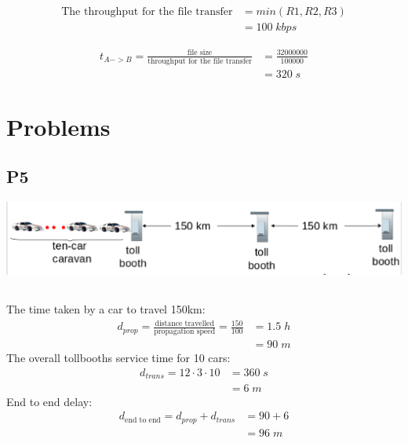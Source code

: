 \documentclass[journal]{IEEEtran}
\begin{document}
\subsection{}
\begin{equation*} 
  \begin{split}
    \text{The throughput for the file transfer} & = min(R1, R2, R3) \\
   & = 100\;kbps
  \end{split}
\end{equation*}

\begin{equation*}
  \begin{split}
  t_{A->B}=\frac{\text{file size}}{\text{throughput for the file transfer}} & = \frac{32000000}{100000} \\
  & = 320\;s
  \end{split}
\end{equation*}

\section{Problems}


\subsection*{P5}
\includegraphics[scale=0.25]{P5}
\subsection{}
The time taken by a car to travel 150\;km:
\begin{equation*}
  \begin{split}
d_{prop}=\frac{\text{distance travelled}}{\text{propagation speed}}  = \frac{150}{100} & = 1.5\;h\\
& = 90\;m
  \end{split}
\end{equation*}
\hspace{0.3cm}The overall tollbooths service time for 10 cars:
\begin{equation*}
  \begin{split}
  d_{trans} = 12 \cdot 3 \cdot 10 & = 360\;s \\
  & = 6\;m
  \end{split}
\end{equation*}
\hspace{0.3cm}End to end delay:
\begin{equation*}
  \begin{split}
  d_{\text{end to end}} = d_{prop} + d_{trans} & = 90 + 6 \\
  & = 96 \;m
  \end{split}
\end{equation*}
\end{document}
